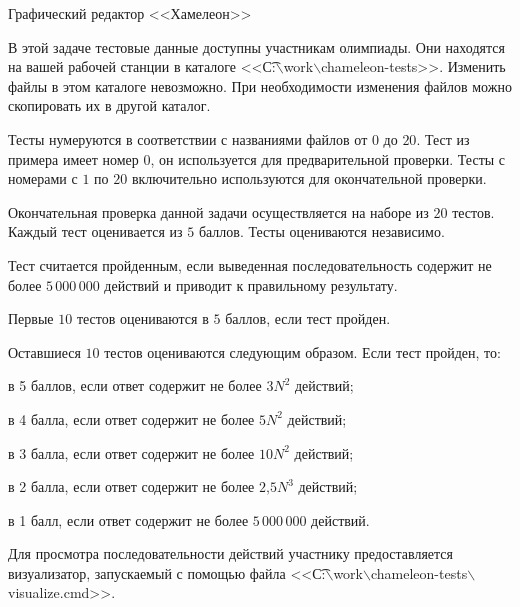 \begin{problem}{Графический редактор <<Хамелеон>>}
\Extra

В этой задаче тестовые данные доступны участникам олимпиады. Они находятся на
вашей рабочей станции в каталоге <<\t{С:$\backslash$work$\backslash$chameleon-tests}>>.
Изменить файлы в этом каталоге невозможно. При необходимости изменения
файлов можно скопировать их в другой каталог.

Тесты нумеруются в соответствии с названиями файлов от $0$ до $20$.
Тест из примера имеет номер $0$, он используется для предварительной
проверки.
Тесты с номерами с $1$ по $20$ включительно используются для
окончательной проверки.

\newpage

\Scoring

Окончательная проверка данной задачи осуществляется на наборе из $20$ тестов.
Каждый тест оценивается из $5$ баллов. Тесты оцениваются независимо. 

Тест считается пройденным, если выведенная последовательность содержит не более
$5\,000\,000$ действий и приводит к правильному 
результату. 

Первые $10$ тестов оцениваются в $5$ баллов, если тест пройден.

Оставшиеся $10$ тестов оцениваются следующим образом. Если тест пройден, то:
\begin{shortitems}
\item в 5 баллов, если ответ содержит не более $3 N^2$ действий;
\item в 4 балла, если ответ содержит не более $5 N^2$ действий;
\item в 3 балла, если ответ содержит не более $10 N^2$ действий;
\item в 2 балла, если ответ содержит не более $2\mbox{,}5 N^3$ действий;
\item в 1 балл, если ответ содержит не более $5\,000\,000$ действий.
\end{shortitems}


\Example

\begin{example}
%
\end{example}

\Visualiser

Для просмотра последовательности действий
участнику предоставляется визуализатор, запускаемый с помощью файла
<<\t{С:$\backslash$work$\backslash$chameleon-tests$\backslash$visualize.cmd}>>.


\end{problem}
